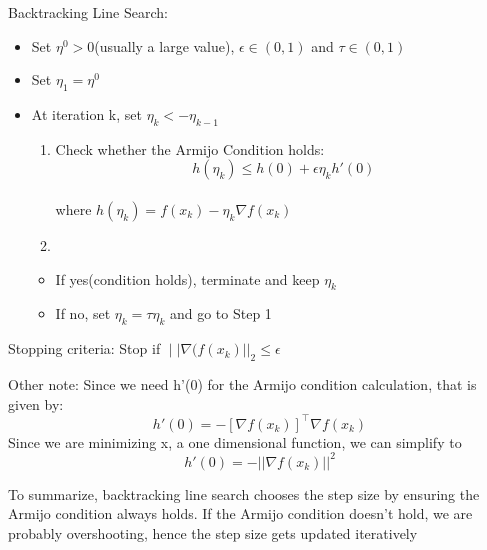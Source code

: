 \documentclass[
  letterpaper,
  DIV=11,
  numbers=noendperiod]{scrartcl}
\providecommand{\tightlist}{%
  \setlength{\itemsep}{0pt}\setlength{\parskip}{0pt}}\usepackage{longtable,booktabs,array}
\begin{document}
Backtracking Line Search:

\begin{itemize}
\tightlist
\item
  Set \(η^0 > 0\)(usually a large value), \(ϵ ∈ (0,1)\) and
  \(τ ∈ (0,1)\)
\item
  Set \(η_1 = η^0\)
\item
  At iteration k, set \(η_k <- η_{k-1}\)

  \begin{enumerate}
  \def\labelenumi{\arabic{enumi}.}
  \tightlist
  \item
    Check whether the Armijo Condition holds: \[
    h(η_k) ≤ h(0) + ϵη_kh'(0)
    \]\\
    where \(h(η_k) = f(x_k) − η_k ∇f(x_k)\)
  \item
  \end{enumerate}

  \begin{itemize}
  \tightlist
  \item
    If yes(condition holds), terminate and keep \(η_k\)
  \item
    If no, set \(η_k = τη_k\) and go to Step 1
  \end{itemize}
\end{itemize}

Stopping criteria: Stop if \(∣|∇(f(x_k)||_2 ≤ ϵ\)

Other note: Since we need h'(0) for the Armijo condition calculation,
that is given by:\\
\[
h'(0) = -[∇f(x_k)]^\top ∇f(x_k)
\] Since we are minimizing x, a one dimensional function, we can
simplify to\\
\[
h'(0) = -||∇f(x_k)||^2
\]

To summarize, backtracking line search chooses the step size by ensuring
the Armijo condition always holds. If the Armijo condition doesn't hold,
we are probably overshooting, hence the step size gets updated
iteratively
\end{document}
